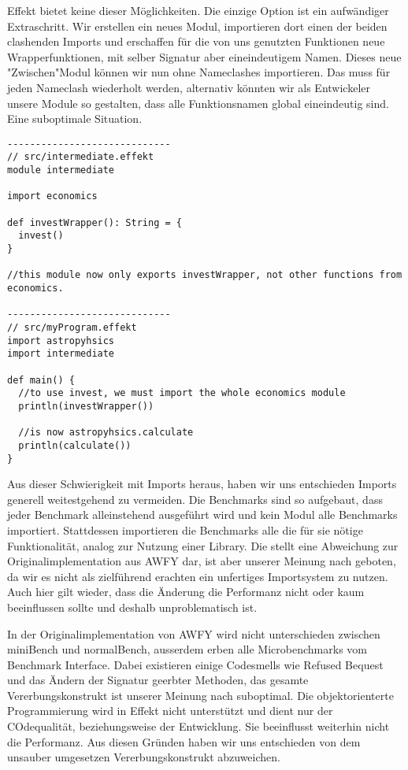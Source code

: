 Effekt bietet keine dieser Möglichkeiten. Die einzige Option ist ein aufwändiger Extraschritt. Wir erstellen ein neues Modul, importieren dort einen der beiden clashenden Imports und erschaffen für die von uns genutzten Funktionen neue Wrapperfunktionen, mit selber Signatur aber eineindeutigem Namen.
Dieses neue "Zwischen"Modul können wir nun ohne Nameclashes importieren.
Das muss für jeden Nameclash wiederholt werden, alternativ könnten wir als Entwickeler unsere Module so gestalten, dass alle Funktionsnamen global eineindeutig sind. Eine suboptimale Situation.
\begin{lstlisting}
-----------------------------
// src/intermediate.effekt
module intermediate

import economics

def investWrapper(): String = {
  invest()
}

//this module now only exports investWrapper, not other functions from economics.

-----------------------------
// src/myProgram.effekt
import astropyhsics
import intermediate

def main() {
  //to use invest, we must import the whole economics module
  println(investWrapper())

  //is now astropyhsics.calculate
  println(calculate())
}
\end{lstlisting}

Aus dieser Schwierigkeit mit Imports heraus, haben wir uns entschieden Imports generell weitestgehend zu vermeiden.
Die Benchmarks sind so aufgebaut, dass jeder Benchmark alleinstehend ausgeführt wird und kein Modul alle Benchmarks importiert. Stattdessen importieren die Benchmarks alle die für sie nötige Funktionalität, analog zur Nutzung einer Library. Die stellt eine Abweichung zur Originalimplementation aus AWFY dar, ist aber unserer Meinung nach geboten, da wir es nicht als zielführend erachten ein unfertiges Importsystem zu nutzen. Auch hier gilt wieder, dass die Änderung die Performanz nicht oder kaum beeinflussen sollte und deshalb unproblematisch ist.

In der Originalimplementation von AWFY wird nicht unterschieden zwischen miniBench und normalBench, ausserdem erben alle Microbenchmarks vom Benchmark Interface. Dabei existieren einige Codesmells wie Refused Bequest und das Ändern der Signatur geerbter Methoden, das gesamte Vererbungskonstrukt ist unserer Meinung nach suboptimal. Die objektorienterte Programmierung wird in Effekt nicht unterstützt und dient nur der COdequalität, beziehungsweise der Entwicklung. Sie beeinflusst weiterhin nicht die Performanz. Aus diesen Gründen haben wir uns entschieden von dem unsauber umgesetzen Vererbungskonstrukt abzuweichen.

